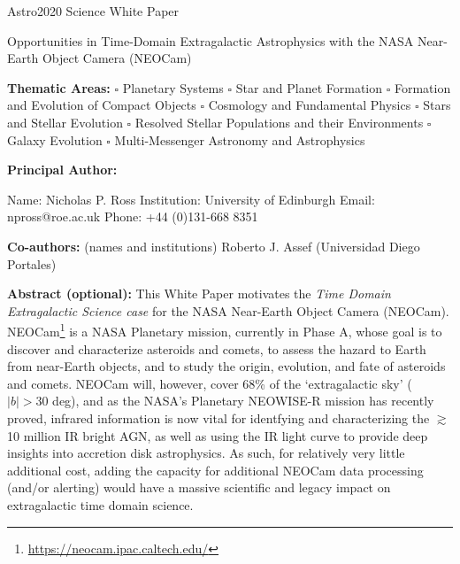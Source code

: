 \documentclass[12pt]{article}
\begin{document}
\raggedright
\huge
Astro2020 Science White Paper \linebreak

Opportunities in Time-Domain Extragalactic Astrophysics with the NASA
Near-Earth Object Camera (NEOCam)
\linebreak
\normalsize

\noindent \textbf{Thematic Areas:} 
\hspace*{60pt} $\square$ Planetary Systems 
\hspace*{10pt} $\square$ Star and Planet Formation 
\hspace*{20pt} 
\linebreak
$\square$ Formation and Evolution of Compact Objects 
\hspace*{31pt} $\square$ Cosmology and Fundamental Physics 
\linebreak
  $\square$  Stars and Stellar Evolution \hspace*{1pt} 
 $\square$ Resolved Stellar Populations and their Environments \hspace*{40pt} 
\linebreak
  $\square$    Galaxy Evolution   \hspace*{45pt} $\square$             
Multi-Messenger Astronomy and Astrophysics \hspace*{65pt} \linebreak
  
\textbf{Principal Author:}

Name: Nicholas P. Ross	
 \linebreak						
Institution:  University of Edinburgh
 \linebreak
Email: npross@roe.ac.uk
 \linebreak
Phone:  +44 (0)131-668 8351
 \linebreak
 
\textbf{Co-authors:} (names and institutions)
  \linebreak
Roberto J. Assef (Universidad Diego Portales)   \linebreak


\textbf{Abstract  (optional):}
This White Paper motivates the {\it Time Domain Extragalactic Science
case} for the NASA Near-Earth Object Camera (NEOCam).
NEOCam\footnote{\href{https://neocam.ipac.caltech.edu/}{https://neocam.ipac.caltech.edu/}}
is a NASA Planetary mission, currently in Phase A, whose goal is to
discover and characterize asteroids and comets, to assess the hazard
to Earth from near-Earth objects, and to study the origin, evolution,
and fate of asteroids and comets.
NEOCam will, however, cover 68\% of the `extragalactic sky'
($ |b| > 30$ deg), and as the NASA's Planetary NEOWISE-R mission has recently proved,
infrared information is now vital for identfying and characterizing
the $\gtrsim$10 million IR bright AGN, as well as using the IR light
curve to provide deep insights into accretion disk astrophysics.
As such, for relatively very little additional cost, adding the
capacity for additional NEOCam data processing (and/or alerting) would
have a massive scientific and legacy impact on extragalactic time
domain science.
\end{document}
